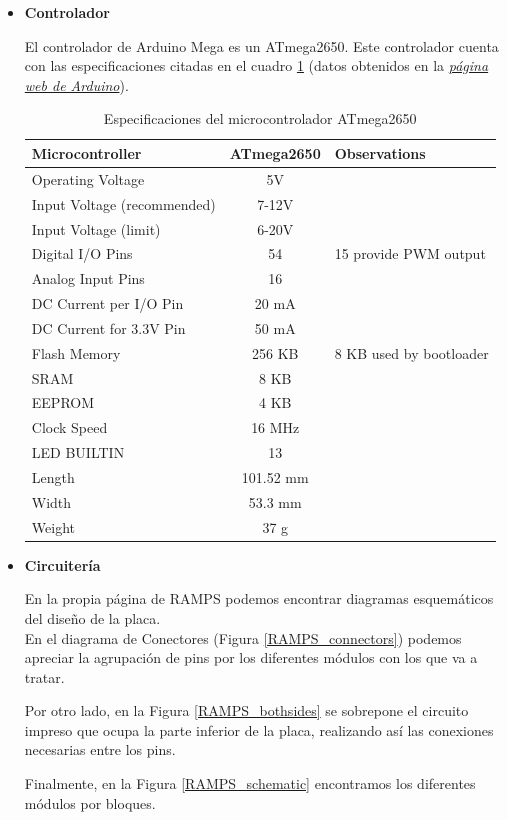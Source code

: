 \documentclass[a4paper,12pt]{article}
\begin{document}
\begin{itemize}
	\item \textbf{Controlador}

	El controlador de Arduino Mega es un ATmega2650. Este controlador cuenta con las especificaciones citadas en el cuadro \ref{table:ATmega2650} (datos obtenidos en la  \emph{\href{https://www.arduino.cc/en/Main/arduinoBoardMega2560}{página web de Arduino}}).

\begin{table}[h!]
\begin{center}
\begin{tabular}{ |l|c|l| }
\hline
Microcontroller & ATmega2650 & Observations \\ 
\hline
Operating Voltage & 5V & \\
Input Voltage (recommended) & 7-12V & \\
Input Voltage (limit) & 6-20V & \\
Digital I/O Pins & 54 & 15 provide PWM output\\
Analog Input Pins & 16 & \\
DC Current per I/O Pin & 20 mA & \\
DC Current for 3.3V Pin & 50 mA & \\
Flash Memory & 256 KB & 8 KB used by bootloader\\
SRAM & 8 KB & \\
EEPROM & 4 KB & \\
Clock Speed & 16 MHz & \\
LED BUILTIN & 13 & \\
Length & 101.52 mm & \\
Width & 53.3 mm & \\
Weight & 37 g & \\
\hline
\end{tabular}
\caption{Especificaciones del microcontrolador ATmega2650}
\label{table:ATmega2650}
\end{center}
\end{table}


\item \textbf{Circuitería}

En la propia página de RAMPS podemos encontrar diagramas esquemáticos del diseño de la placa.\\

En el diagrama de Conectores (Figura \ref{RAMPS_connectors}) podemos apreciar la agrupación de pins por los diferentes módulos con los que va a tratar.

Por otro lado, en la Figura \ref{RAMPS_bothsides} se sobrepone el circuito impreso que ocupa la parte inferior de la placa, realizando así las conexiones necesarias entre los pins.

Finalmente, en la Figura \ref{RAMPS_schematic} encontramos los diferentes módulos por bloques.

\end{itemize}
\end{document}

